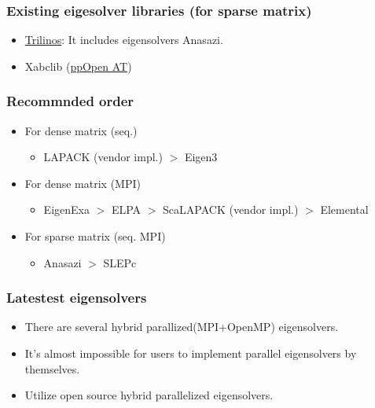 \begin{frame}
  \frametitle{Existing eigesolver libraries (for sparse matrix)}
  \begin{itemize}
  \item \href{http://trilinos.org}{Trilinos}: It includes eigensolvers Anasazi.
  \item Xabclib (\href{http://ppopenhpc.cc.u-tokyo.ac.jp/}{ppOpen AT})
  \end{itemize}
\end{frame}

\begin{frame}
  \frametitle{Recommnded order}
  \begin{itemize}
  \item For dense matrix (seq.)
    \begin{itemize}
      \item LAPACK (vendor impl.) $>$ Eigen3
    \end{itemize}
  \item For dense matrix (MPI)
    \begin{itemize}
      \item EigenExa $>$ ELPA $>$ ScaLAPACK (vendor impl.) $>$ Elemental
    \end{itemize}
  \item For sparse matrix (seq. MPI)
    \begin{itemize}
      \item Anasazi $>$ SLEPc
    \end{itemize}
  \end{itemize}
\end{frame}

\begin{frame}
  \frametitle{Latestest eigensolvers}
  \begin{itemize}
    \setlength{\itemsep}{1em}
  \item There are several hybrid parallized(MPI+OpenMP) eigensolvers.
  \item It’s almost impossible for users to implement parallel eigensolvers by themselves.
  \item Utilize open source hybrid parallelized eigensolvers.
  \end{itemize}
\end{frame}

